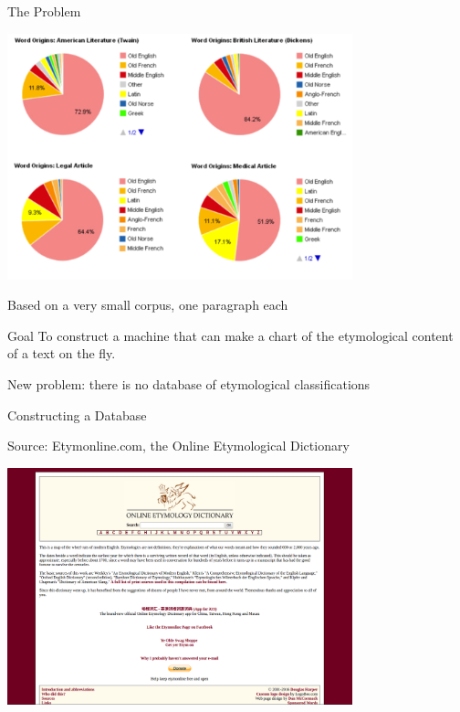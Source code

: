\documentclass[10pt]{beamer}
\begin{document}
\begin{frame}[fragile]{The Problem}
  
  \pause
  \centerline{\includegraphics[width=10cm]{blogcharts.png}}

  Based on a very small corpus, one paragraph each
  

\end{frame}


\begin{frame}[fragile]{Goal}
  \pause
  To construct a machine that can make a chart of the etymological content of a text on the fly. 

  \pause

  New problem: there is no database of etymological classifications

  
\end{frame}

\begin{frame}[fragile]{Constructing a Database}
  \pause

  Source: Etymonline.com, the Online Etymological Dictionary

  \pause
  \centerline{\includegraphics[width=10cm]{etymonlinehomepage.png}}

  
\end{frame}
\end{document}
